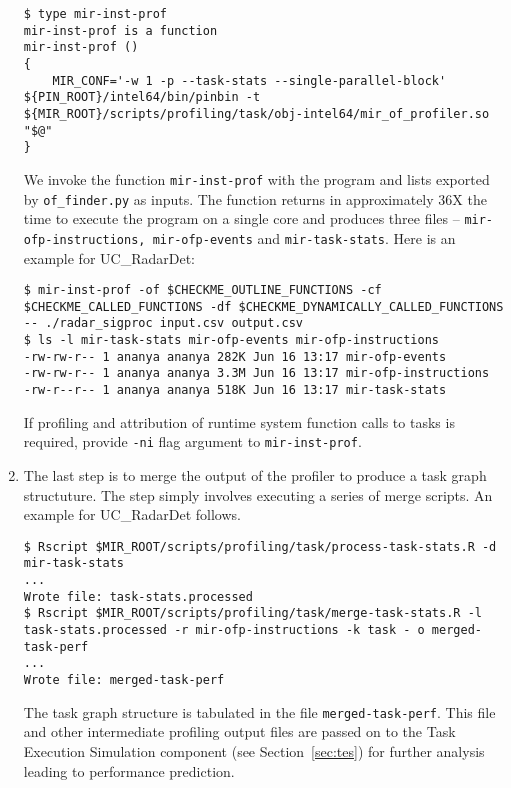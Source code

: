 \documentclass[11pt,a4paper]{article}
\begin{document}
\begin{enumerate}
\begin{lstlisting}[style=MyInputStyle]
$ type mir-inst-prof 
mir-inst-prof is a function
mir-inst-prof () 
{ 
    MIR_CONF='-w 1 -p --task-stats --single-parallel-block' ${PIN_ROOT}/intel64/bin/pinbin -t ${MIR_ROOT}/scripts/profiling/task/obj-intel64/mir_of_profiler.so "$@"
}
\end{lstlisting}

We invoke the function \texttt{mir-inst-prof} with the program and lists exported by \texttt{of\_finder.py} as inputs. The function returns in approximately 36X  the time to execute the program on a single core and produces three files -- \texttt{mir-ofp-instructions, mir-ofp-events} and \texttt{mir-task-stats}. Here is an example for UC\_RadarDet:

\begin{lstlisting}[style=MyInputStyle]
$ mir-inst-prof -of $CHECKME_OUTLINE_FUNCTIONS -cf $CHECKME_CALLED_FUNCTIONS -df $CHECKME_DYNAMICALLY_CALLED_FUNCTIONS -- ./radar_sigproc input.csv output.csv
$ ls -l mir-task-stats mir-ofp-events mir-ofp-instructions
-rw-rw-r-- 1 ananya ananya 282K Jun 16 13:17 mir-ofp-events
-rw-rw-r-- 1 ananya ananya 3.3M Jun 16 13:17 mir-ofp-instructions
-rw-r--r-- 1 ananya ananya 518K Jun 16 13:17 mir-task-stats
\end{lstlisting}

If profiling and attribution of runtime system function calls to tasks is required, provide \texttt{-ni} flag argument to \texttt{mir-inst-prof}.

\item The last step is to merge the output of the profiler to produce a task graph structuture. The step simply involves executing a series of merge scripts. An example for UC\_RadarDet follows.

\begin{lstlisting}[style=MyInputStyle]
$ Rscript $MIR_ROOT/scripts/profiling/task/process-task-stats.R -d mir-task-stats
...
Wrote file: task-stats.processed
$ Rscript $MIR_ROOT/scripts/profiling/task/merge-task-stats.R -l task-stats.processed -r mir-ofp-instructions -k task - o merged-task-perf
...
Wrote file: merged-task-perf
\end{lstlisting}

The task graph structure is tabulated in the file \texttt{merged-task-perf}. This file and other intermediate profiling output files are passed on to the Task Execution Simulation component (see Section~\ref{sec:tes}) for further analysis leading to performance prediction.
\end{enumerate}
\end{document}
